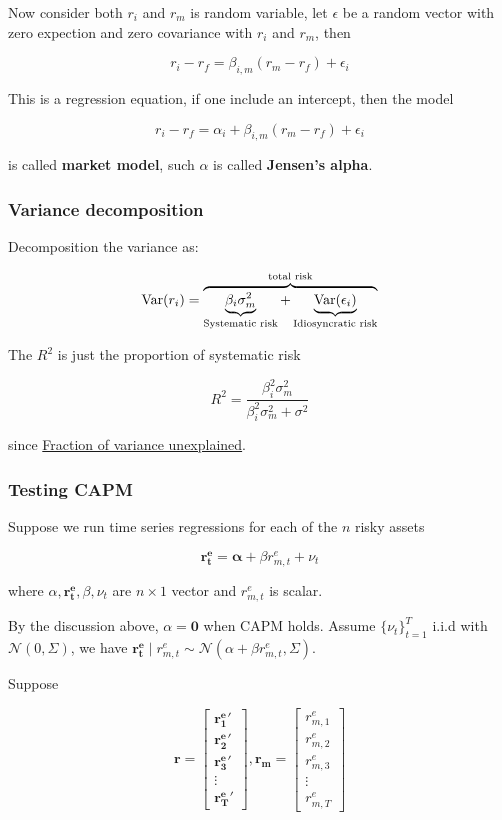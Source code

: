 \documentclass{article}
\begin{document}
Now consider both \(r_i\) and \(r_m\) is random variable, let
\(\epsilon\) be a random vector with zero expection and zero covariance
with \(r_i\) and \(r_m\), then

\[ 
r_i-r_f=\beta_{i,m}(r_m-r_f)+\epsilon_i
\]

This is a regression equation, if one include an intercept, then the
model

\[ 
r_i-r_f=\alpha_i+\beta_{i,m}(r_m-r_f)+\epsilon_i
\]

is called \textbf{market model}, such \(\alpha\) is called
\textbf{Jensen's alpha}.

\hypertarget{variance-decomposition}{%
\subsubsection{Variance decomposition}\label{variance-decomposition}}

Decomposition the variance as:

\[ \operatorname{Var}(r_i)=\overbrace{\underbrace{\beta_i\sigma_m^2}_{\text{Systematic risk}}+\underbrace{\operatorname{Var}(\epsilon_i)}_{\text{Idiosyncratic risk}}}^{\text{total risk}} \]

The \(R^2\) is just the proportion of systematic risk

\[ R^2=\frac{\beta_i^2\sigma_m^2}{\beta_i^2\sigma_m^2+\sigma^2} \]

since
\href{https://en.wikipedia.org/wiki/Fraction_of_variance_unexplained}{Fraction
of variance unexplained}.

\hypertarget{testing-capm}{%
\subsubsection{Testing CAPM}\label{testing-capm}}

Suppose we run time series regressions for each of the \(n\) risky
assets

\[ \mathbf{r_t^e=\alpha}+{\beta r_{m,t}^e+\nu_t} \]

where \(\alpha,\mathbf{r_t^e},\beta,\nu_t\) are \(n\times 1\) vector and
\(r_{m,t}^e\) is scalar.

By the discussion above, \(\alpha=\mathbf{0}\) when CAPM holds. Assume
\(\{\nu_t\}_{t=1}^T\) i.i.d with \(\mathcal{N}(0,\Sigma)\), we have
\(\mathbf{r_t^e}\mid r_{m,t}^e\sim \mathcal{N}(\alpha+\beta r_{m,t}^e,\Sigma)\).

Suppose

\[\mathbf{r}= \begin{bmatrix}
  \mathbf{r_1^e}'\\
  \mathbf{r_2^e}'\\
  \mathbf{r_3^e}'\\
  \vdots\\
  \mathbf{r_T^e}'
\end{bmatrix},\mathbf{r_m}=\begin{bmatrix}
  r_{m,1}^e\\
  r_{m,2}^e\\
  r_{m,3}^e\\
  \vdots\\
  r_{m,T}^e
\end{bmatrix} \]
\end{document}
